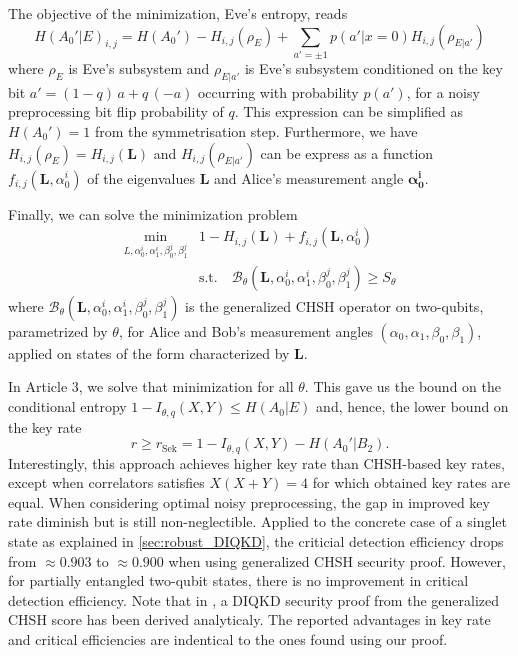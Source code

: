 The objective of the minimization, Eve's entropy, reads
\begin{equation}
	H(A_0'|E)_{i,j} = H(A_0') - H_{i,j}(\rho_E) + \sum_{a' = \pm 1} p(a'|x=0)H_{i,j}(\rho_{E|a'})	
\end{equation}
where $\rho_E$ is Eve's subsystem and $\rho_{E|a'}$ is Eve's subsystem conditioned on the key bit $a' = (1-q)\,a + q\,(-a)$ occurring with probability $p(a')$, for a noisy preprocessing bit flip probability of $q$.
This expression can be simplified as $H(A_0')=1$ from the symmetrisation step.
Furthermore, we have $H_{i,j}(\rho_E)=H_{i,j}(\mathbf{L})$ and $H_{i,j}(\rho_{E|a'})$ can be express as a function $f_{i,j}(\mathbf{L},\alpha_0^i)$ of the eigenvalues $\mathbf{L}$ and Alice's measurement angle $\mathbf{\alpha_0^i}$.

Finally, we can solve the minimization problem 
\begin{equation}
	\begin{split}
		\min_{L,\alpha_0^i,\alpha_1^i,\beta_0^j,\beta_1^j} &1 - H_{i,j}(\mathbf{L}) + f_{i,j}(\mathbf{L},\alpha_0^i) \\
		&\mathrm{s.t.}\quad 
		\mathcal{B}_\theta (\mathbf{L},\alpha_0^i,\alpha_1^i,\beta_0^j,\beta_1^j) \geq S_\theta
	\end{split}
\end{equation}
where $\mathcal{B}_\theta (\mathbf{L},\alpha_0^i,\alpha_1^i,\beta_0^j,\beta_1^j)$ is the generalized CHSH operator on two-qubits, parametrized by $\theta$, for Alice and Bob's measurement angles $(\alpha_0,\alpha_1,\beta_0,\beta_1)$, applied on states of the form  characterized by $\mathbf{L}$.

In Article 3, we solve that minimization for all $\theta$. This gave us the bound on the conditional entropy $1-I_{\theta,q}(X,Y)\leq H(A_0|E)$ and, hence, the lower bound on the key rate
\begin{equation}
	r \geq r_\mathrm{Sek} = 1 - I_{\theta,q}(X,Y) - H(A_0'|B_2).
	\label{eq:Sekatstki}
\end{equation}
Interestingly, this approach achieves higher key rate than CHSH-based key rates, except when correlators satisfies $X(X+Y)=4$ for which obtained key rates are equal.
When considering optimal noisy preprocessing, the gap in improved key rate diminish but is still non-neglectible.
Applied to the concrete case of a singlet state as explained in \ref{sec:robust_DIQKD}, the criticial detection efficiency drops from $\approx 0.903$ to $\approx 0.900$ when using generalized CHSH security proof.
However, for partially entangled two-qubit states, there is no improvement in critical detection efficiency.
Note that in \cite{Woodhead2021}, a DIQKD security proof from the generalized CHSH score has been derived analyticaly. The reported advantages in key rate and critical efficiencies are indentical to the ones found using our proof.

